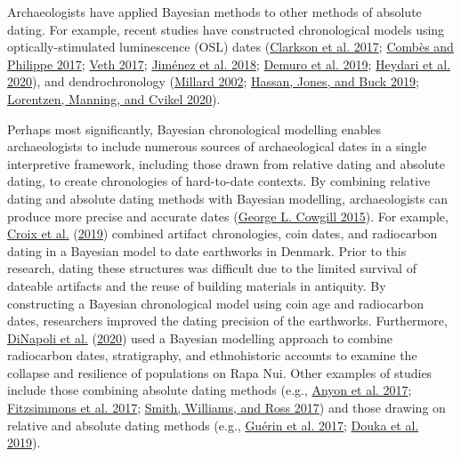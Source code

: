 \documentclass[
]{article}
\begin{document}
Archaeologists have applied Bayesian methods to other methods of
absolute dating. For example, recent studies have constructed
chronological models using optically-stimulated luminescence (OSL) dates
(\protect\hyperlink{ref-clarkson_human_2017}{Clarkson et al. 2017};
\protect\hyperlink{ref-combes_bayesian_2017}{Combès and Philippe 2017};
\protect\hyperlink{ref-veth_early_2017}{Veth 2017};
\protect\hyperlink{ref-jimenez_cultural_2018}{Jiménez et al. 2018};
\protect\hyperlink{ref-demuro_corrigendum_2019}{Demuro et al. 2019};
\protect\hyperlink{ref-heydari_bayesian_2020}{Heydari et al. 2020}), and
dendrochronology (\protect\hyperlink{ref-millard_bayesian_2002}{Millard
2002}; \protect\hyperlink{ref-hassan_simple_2019}{Hassan, Jones, and
Buck 2019};
\protect\hyperlink{ref-lorentzen_shipbuilding_2020}{Lorentzen, Manning,
and Cvikel 2020}).

Perhaps most significantly, Bayesian chronological modelling enables
archaeologists to include numerous sources of archaeological dates in a
single interpretive framework, including those drawn from relative
dating and absolute dating, to create chronologies of hard-to-date
contexts. By combining relative dating and absolute dating methods with
Bayesian modelling, archaeologists can produce more precise and accurate
dates (\protect\hyperlink{ref-cowgill_we_2015}{George L. Cowgill 2015}).
For example, \protect\hyperlink{ref-croix_dating_2019}{Croix et al.}
(\protect\hyperlink{ref-croix_dating_2019}{2019}) combined artifact
chronologies, coin dates, and radiocarbon dating in a Bayesian model to
date earthworks in Denmark. Prior to this research, dating these
structures was difficult due to the limited survival of dateable
artifacts and the reuse of building materials in antiquity. By
constructing a Bayesian chronological model using coin age and
radiocarbon dates, researchers improved the dating precision of the
earthworks. Furthermore,
\protect\hyperlink{ref-dinapoli_model-based_2020}{DiNapoli et al.}
(\protect\hyperlink{ref-dinapoli_model-based_2020}{2020}) used a
Bayesian modelling approach to combine radiocarbon dates, stratigraphy,
and ethnohistoric accounts to examine the collapse and resilience of
populations on Rapa Nui. Other examples of studies include those
combining absolute dating methods (e.g.,
\protect\hyperlink{ref-anyon_re-evaluating_2017}{Anyon et al. 2017};
\protect\hyperlink{ref-fitzsimmons_chronological_2017}{Fitzsimmons et
al. 2017}; \protect\hyperlink{ref-smith_puntutjarpa_2017}{Smith,
Williams, and Ross 2017}) and those drawing on relative and absolute
dating methods (e.g.,
\protect\hyperlink{ref-guerin_chronology_2017}{Guérin et al. 2017};
\protect\hyperlink{ref-douka_age_2019}{Douka et al. 2019}).
\end{document}
